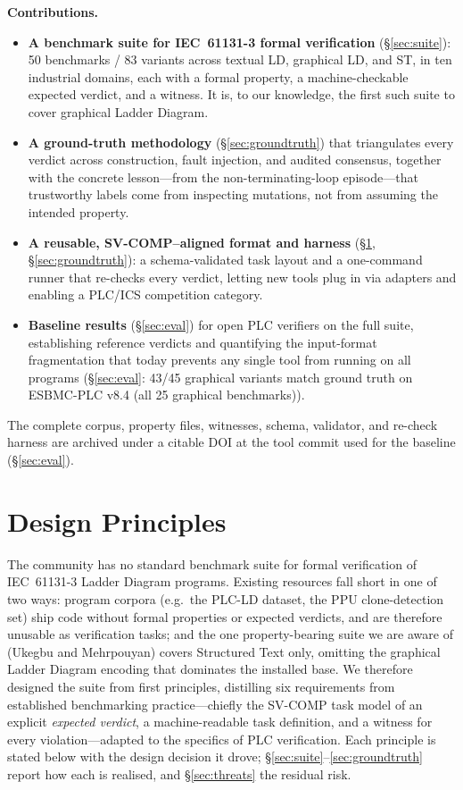 \medskip\noindent\textbf{Contributions.}
\begin{itemize}
  \item \textbf{A benchmark suite for IEC~61131-3 formal verification} (\S\ref{sec:suite}):
    50 benchmarks / 83 variants across textual LD, graphical LD, and ST, in ten industrial
    domains, each with a formal property, a machine-checkable expected verdict, and a witness.
    It is, to our knowledge, the first such suite to cover graphical Ladder Diagram.
  \item \textbf{A ground-truth methodology} (\S\ref{sec:groundtruth}) that triangulates every
    verdict across construction, fault injection, and audited consensus, together with the
    concrete lesson---from the non-terminating-loop episode---that trustworthy labels come
    from inspecting mutations, not from assuming the intended property.
  \item \textbf{A reusable, SV-COMP--aligned format and harness} (\S\ref{sec:principles},
    \S\ref{sec:groundtruth}): a schema-validated task layout and a one-command runner that
    re-checks every verdict, letting new tools plug in via adapters and enabling a PLC/ICS
    competition category.
  \item \textbf{Baseline results} (\S\ref{sec:eval}) for open PLC verifiers on the full
    suite, establishing reference verdicts and quantifying the input-format fragmentation
    that today prevents any single tool from running on all programs (\S\ref{sec:eval}: 43/45
    graphical variants match ground truth on ESBMC-PLC v8.4 (all 25 graphical benchmarks)).
\end{itemize}

\medskip\noindent
The complete corpus, property files, witnesses, schema, validator, and re-check harness are
archived under a citable DOI at the tool commit used for the baseline (\S\ref{sec:eval}).


\section{Design Principles}
\label{sec:principles}

The community has no standard benchmark suite for formal verification of IEC~61131-3
Ladder Diagram programs. Existing resources fall short in one of two ways: program
corpora (e.g.\ the PLC-LD dataset, the PPU clone-detection set) ship code without formal
properties or expected verdicts, and are therefore unusable as verification tasks; and
the one property-bearing suite we are aware of (Ukegbu and Mehrpouyan) covers Structured
Text only, omitting the graphical Ladder Diagram encoding that dominates the installed
base. We therefore designed the suite from first principles, distilling six requirements
from established benchmarking practice---chiefly the SV-COMP task model of an explicit
\emph{expected verdict}, a machine-readable task definition, and a witness for every
violation---adapted to the specifics of PLC verification. Each principle is stated below
with the design decision it drove; \S\ref{sec:suite}--\ref{sec:groundtruth} report how
each is realised, and \S\ref{sec:threats} the residual risk.

